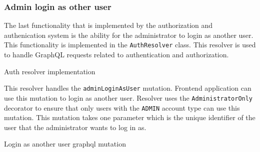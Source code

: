 \documentclass[../main.tex]{subfiles}
\begin{document}
\subsubsection{Admin login as other user}

The last functionality that is implemented by the authorization and authenication system is the ability for the administrator to login as another user.
This functionality is implemented in the \texttt{AuthResolver} class. This resolver is used to handle GraphQL requests related to authentication and authorization.

\begin{listing}[H]
  \caption{Auth resolver implementation}
  \label{code:auth-resolver}
\end{listing}

This resolver handles the \texttt{adminLoginAsUser} mutation. Frontend application can use this mutation to login as another user.
Resolver uses the \texttt{AdministratorOnly} decorator to ensure that only users with the \texttt{ADMIN} account type can use this mutation.
This mutation takes one parameter which is the unique identifier of the user that the administrator wants to log in as.

\begin{listing}[H]
  \caption{Login as another user graphql mutation}
\end{listing}
\end{document}
